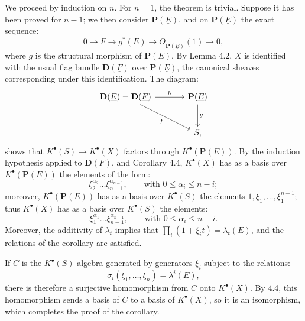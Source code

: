 We proceed by induction on \(n\). For \(n=1\), the theorem is trivial. Suppose it has been proved for \(n-1\); we then consider \(\mathbf P(\underline{E})\), and on \(\mathbf P(\underline{E})\) the exact sequence:
\[
  0\longrightarrow \underline{F}\longrightarrow g^*(\underline{E})\longrightarrow \underline{O}_{\mathbf P(\underline{E})}(1)\longrightarrow 0,
\]
where \(g\) is the structural morphism of \(\mathbf P(\underline{E})\). By Lemma 4.2, \(X\) is identified with the usual flag bundle \(\mathbf D(\underline{F})\) over \(\mathbf P(\underline{E})\), the canonical sheaves corresponding under this identification. The diagram:
\[
\begin{tikzcd}[column sep=large,row sep=large]
\mathbf D(\underline{E})=\mathbf D(\underline{F}) \arrow[r,"h"] \arrow[dr,"f"'] & \mathbf P(\underline{E}) \arrow[d,"g"]\\
& S,
\end{tikzcd}
\]
shows that \(K^{\bullet}(S)\to K^{\bullet}(X)\) factors through \(K^{\bullet}(\mathbf P(\underline{E}))\). By the induction hypothesis applied to \(\mathbf D(\underline{F})\), and Corollary 4.4, \(K^{\bullet}(X)\) has as a basis over \(K^{\bullet}(\mathbf P(\underline{E}))\) the elements of the form:
\[
  \xi_2^{\alpha_2}\ldots\xi_{n-1}^{\alpha_{n-1}},
  \qquad \text{with } 0\le\alpha_i\le n-i;
\]
moreover, \(K^{\bullet}(\mathbf P(\underline{E}))\) has as a basis over \(K^{\bullet}(S)\) the elements \(1,\xi_1,\ldots,\xi_1^{n-1}\); thus \(K^{\bullet}(X)\) has as a basis over \(K^{\bullet}(S)\) the elements:
%
\[
  \xi_1^{\alpha_1}\ldots\xi_{n-1}^{\alpha_{n-1}},
  \qquad
\text{with } 0\le\alpha_i\le n-i.
\]
Moreover, the additivity of \(\lambda_t\) implies that \(\prod_i(1+\xi_i t)=\lambda_t(E)\), and the relations of the corollary are satisfied.

If \(C\) is the \(K^{\bullet}(S)\)-algebra generated by generators \(\xi_i\) subject to the relations:
\[
  \sigma_i(\xi_1,\ldots,\xi_n)=\lambda^i(E),
\]
there is therefore a surjective homomorphism from \(C\) onto \(K^{\bullet}(X)\). By 4.4, this homomorphism sends a basis of \(C\) to a basis of \(K^{\bullet}(X)\), so it is an isomorphism, which completes the proof of the corollary.

